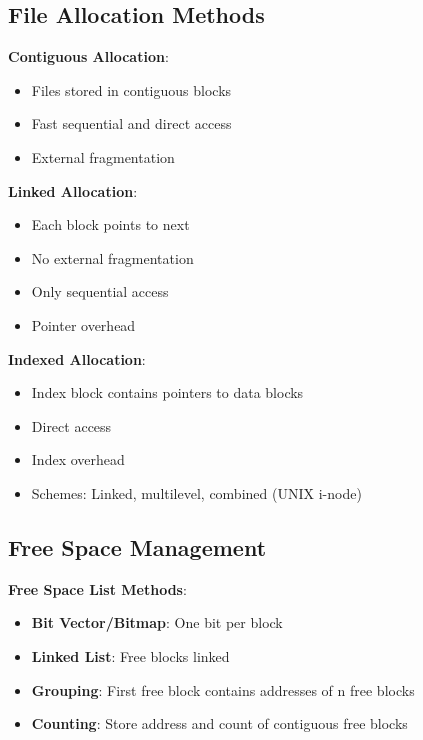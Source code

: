 \documentclass[12pt,a4paper]{report}
\begin{document}
\subsection{File Allocation Methods}
\begin{concept}
\textbf{Contiguous Allocation}:
\begin{itemize}
    \item Files stored in contiguous blocks
    \item Fast sequential and direct access
    \item External fragmentation
\end{itemize}

\textbf{Linked Allocation}:
\begin{itemize}
    \item Each block points to next
    \item No external fragmentation
    \item Only sequential access
    \item Pointer overhead
\end{itemize}

\textbf{Indexed Allocation}:
\begin{itemize}
    \item Index block contains pointers to data blocks
    \item Direct access
    \item Index overhead
    \item Schemes: Linked, multilevel, combined (UNIX i-node)
\end{itemize}
\end{concept}

\subsection{Free Space Management}
\begin{concept}
\textbf{Free Space List Methods}:
\begin{itemize}
    \item \textbf{Bit Vector/Bitmap}: One bit per block
    \item \textbf{Linked List}: Free blocks linked
    \item \textbf{Grouping}: First free block contains addresses of n free blocks
    \item \textbf{Counting}: Store address and count of contiguous free blocks
\end{itemize}
\end{concept}
\end{document}
